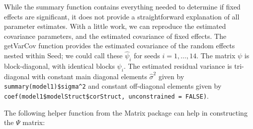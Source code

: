 \documentclass[
]{book}
\begin{document}
While the summary function contains everything needed to determine if fixed effects are significant, it does not provide a straightforward explanation of all parameter estimates. With a little work, we can reproduce the estimated covariance parameters, and the estimated covariance of fixed effects. The getVarCov function provides the estimated covariance of the random effects nested within Seed; we could call these \(\hat\psi_i\) for seeds \(i=1, \ldots, 14\). The matrix \(\psi\) is block-diagonal, with identical blocks \(\psi_i\). The estimated residual variance is tri-diagonal with constant main diagonal elements \(\hat\sigma^2\) given by \texttt{summary(model1)\$sigma\^{}2} and constant off-diagonal elements given by \texttt{coef(model1\$modelStruct\$corStruct,\ unconstrained\ =\ FALSE)}.

The following helper function from the Matrix package can help in constructing the \(\Psi\) matrix:
\end{document}
